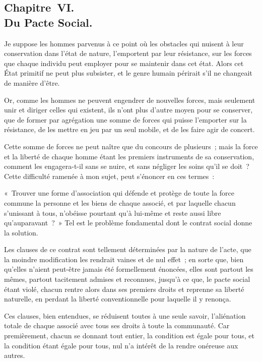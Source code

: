 \documentclass[french,twoside]{book} %
\begin{document}
\subsection[{Chapitre VI. Du Pacte Social.}]{Chapitre VI. \\
Du Pacte Social.}
\noindent Je suppose les hommes parvenus à ce point où les obstacles qui nuisent à leur conservation dans l’état de nature, l’emportent par leur résistance, sur les forces que chaque individu peut employer pour se maintenir dans cet état. Alors cet État primitif ne peut plus subsister, et le genre humain périrait s’il ne changeait de manière d’être.\par
Or, comme les hommes ne peuvent engendrer de nouvelles forces, mais seulement unir et diriger celles qui existent, ils n’ont plus d’autre moyen pour se conserver, que de former par agrégation une somme de forces qui puisse l’emporter sur la résistance, de les mettre en jeu par un seul mobile, et de les faire agir de concert.\par
Cette somme de forces ne peut naître que du concours de plusieurs ; mais la force et la liberté de chaque homme étant les premiers instruments de sa conservation, comment les engagera-t-il sans se nuire, et sans négliger les soins qu’il se doit ? Cette difficulté ramenée à mon sujet, peut s’énoncer en ces termes :\par
« Trouver une forme d’association qui défende et protège de toute la force commune la personne et les biens de chaque associé, et par laquelle chacun s’unissant à tous, n’obéisse pourtant qu’à lui-même et reste aussi libre qu’auparavant ? » Tel est le problème fondamental dont le contrat social donne la solution.\par
Les clauses de ce contrat sont tellement déterminées par la nature de l’acte, que la moindre modification les rendrait vaines et de nul effet ; en sorte que, bien qu’elles n’aient peut-être jamais été formellement énoncées, elles sont partout les mêmes, partout tacitement admises et reconnues, jusqu’à ce que, le pacte social étant violé, chacun rentre alors dans ses premiers droits et reprenne sa liberté naturelle, en perdant la liberté conventionnelle pour laquelle il y renonça.\par
Ces clauses, bien entendues, se réduisent toutes à une seule savoir, l’aliénation totale de chaque associé avec tous ses droits à toute la communauté. Car premièrement, chacun se donnant tout entier, la condition est égale pour tous, et la condition étant égale pour tous, nul n’a intérêt de la rendre onéreuse aux autres.\par
\end{document}
